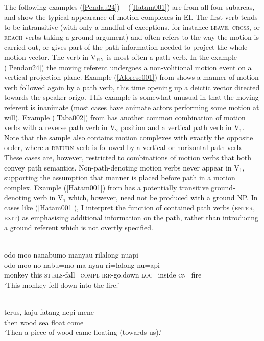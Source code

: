 The following examples (\ref{Pendau24}) -- (\ref{Hatam001}) are from all four subareas, and show the typical appearance of motion complexes in EI. The first verb tends to be intransitive (with only a handful of exceptions, for instance \textsc{leave}, \textsc{cross}, or \textsc{reach} verbs taking a ground argument) and often refers to the way the motion is carried out, or gives part of the path information needed to project the whole motion vector. The verb in V$_{\textsc{fin}}$ is most often a path verb. In the  example (\ref{Pendau24}) the moving referent undergoes a non-volitional motion event on a vertical projection plane. Example (\ref{Alorese001}) from  shows a manner of motion verb followed again by a path verb, this time opening up a deictic vector directed towards the speaker origo. This example is somewhat unusual in that the moving referent is inanimate (most cases have animate actors performing some motion at will). Example (\ref{Taba002}) from  has another common combination of motion verbs with a reverse path verb in V$_{2}$ position and a vertical path verb in V$_{1}$. Note that the sample also contains motion complexes with exactly the opposite order, where a \textsc{return} verb is followed by a vertical or horizontal path verb. These cases are, however, restricted to combinations of motion verbs that both convey path semantics. Non-path-denoting motion verbs never appear in V$_1$, supporting the assumption that manner is placed before path in a motion complex. Example (\ref{Hatam001}) from  has a potentially transitive ground-denoting verb in V$_{1}$ which, however, need not be produced with a ground NP. In cases like (\ref{Hatam001}), I interpret the function of contained path verbs (\textsc{enter}, \textsc{exit}) as emphasising additional information on the path, rather than introducing a ground referent which is not overtly specified.

\ea \label{Pendau24}
\\
\glll odo moo nanabumo manyau rilalong nuapi \\
odo moo no-nabu=mo ma-nyau ri=lalong nu=api \\
monkey this \textsc{st}.\textsc{rls}-fall=\textsc{compl} \textsc{irr}-go.down \textsc{loc}=inside \textsc{cn}=fire \\
\glft `This monkey fell down into the fire.' \\ 
\z

\ea \label{Alorese001}
\\
\gll terus, kaju fatang nepi mene \\
then wood sea float come \\
\glft `Then a piece of wood came floating (towards us).'\\ 
\z

